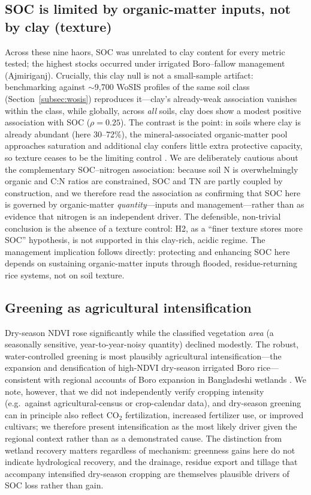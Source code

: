 \documentclass[preprint,authoryear,12pt]{elsarticle}
\begin{document}
\subsection{SOC is limited by organic-matter inputs, not by clay (texture)}
Across these nine haors, SOC was unrelated to clay content for every metric tested; the highest
stocks occurred under irrigated Boro--fallow management (Ajmiriganj). Crucially, this clay null
is not a small-sample artifact: benchmarking against $\sim$9{,}700 WoSIS profiles of the same
soil class (Section~\ref{subsec:wosis}) reproduces it---clay's already-weak association vanishes
within the class, while globally, across \emph{all} soils, clay does show a modest positive
association with SOC ($\rho=0.25$). The contrast is the point: in soils where clay is already
abundant (here 30--72\%), the mineral-associated organic-matter pool approaches saturation and
additional clay confers little extra protective capacity, so texture ceases to be the limiting
control \citep{Cotrufo2019,Georgiou2022}. We are deliberately cautious about the complementary
SOC--nitrogen association: because soil N is overwhelmingly organic and C:N ratios are
constrained, SOC and TN are partly coupled by construction, and we therefore read the
association as confirming that SOC here is governed by organic-matter \emph{quantity}---inputs
and management---rather than as evidence that nitrogen is an independent driver. The defensible,
non-trivial conclusion is the absence of a texture control: H2, as a ``finer texture stores more
SOC'' hypothesis, is not supported in this clay-rich, acidic regime. The management implication follows directly: protecting and enhancing
SOC here depends on sustaining organic-matter inputs through flooded, residue-returning rice
systems, not on soil texture.

\subsection{Greening as agricultural intensification}
Dry-season NDVI rose significantly while the classified vegetation \emph{area} (a seasonally
sensitive, year-to-year-noisy quantity) declined modestly. The robust, water-controlled greening
is most plausibly agricultural intensification---the expansion and densification of high-NDVI
dry-season irrigated Boro rice---consistent with regional accounts of Boro expansion in
Bangladeshi wetlands \citep{Mainuddin2021}. We note, however, that we did not independently verify
cropping intensity (e.g.\ against agricultural-census or crop-calendar data), and dry-season
greening can in principle also reflect CO$_2$ fertilization, increased fertilizer use, or improved
cultivars; we therefore present intensification as the most likely driver given the regional
context rather than as a demonstrated cause. The distinction from wetland recovery matters
regardless of mechanism: greenness gains here do not indicate hydrological recovery, and the
drainage, residue export and tillage that accompany intensified dry-season cropping are themselves
plausible drivers of SOC loss rather than gain.
\end{document}
